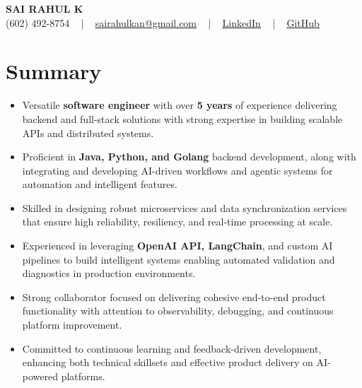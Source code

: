 \documentclass[letterpaper,11pt]{article}
\newcommand{\resumeItem}[1]{
  \item\footnotesize{
    {#1 \vspace{-2pt}}
  }
}
\newcommand{\resumeItemListStart}{\begin{itemize}[leftmargin=*]}
\newcommand{\resumeItemListEnd}{\end{itemize}\vspace{-5pt}}
\begin{document}
\begin{center}
    {\fontsize{14pt}{12pt}\selectfont \textbf{\MakeUppercase{Sai Rahul K}}}\\ \vspace{2pt}
    \fontsize{10pt}{12pt}\selectfont (602) 492-8754 ~ | ~ \href{mailto:sairahulkan@gmail.com}{sairahulkan@gmail.com} ~ | ~
    \href{https://www.linkedin.com/in/rq123/}{\color{blue}\underline{LinkedIn}} ~ | ~
    \href{https://github.com/kanrahuldo}{\color{blue}\underline{GitHub}}~
    \vspace{-8pt}
\end{center}

\section{Summary}
\fontsize{9pt}{10pt}\selectfont
\resumeItemListStart
    \resumeItem{Versatile \textbf{software engineer} with over \textbf{5 years} of experience delivering backend and full-stack solutions with strong expertise in building scalable APIs and distributed systems.} \vspace{-3pt}
    \resumeItem{Proficient in \textbf{Java, Python, and Golang} backend development, along with integrating and developing AI-driven workflows and agentic systems for automation and intelligent features.} \vspace{-3pt}
    \resumeItem{Skilled in designing robust microservices and data synchronization services that ensure high reliability, resiliency, and real-time processing at scale.} \vspace{-3pt}
    \resumeItem{Experienced in leveraging \textbf{OpenAI API, LangChain}, and custom AI pipelines to build intelligent systems enabling automated validation and diagnostics in production environments.} \vspace{-3pt}
    \resumeItem{Strong collaborator focused on delivering cohesive end-to-end product functionality with attention to observability, debugging, and continuous platform improvement.} \vspace{-3pt}
    \resumeItem{Committed to continuous learning and feedback-driven development, enhancing both technical skillsets and effective product delivery on AI-powered platforms.} \vspace{-3pt}
\resumeItemListEnd
\vspace{-6pt}
\end{document}
